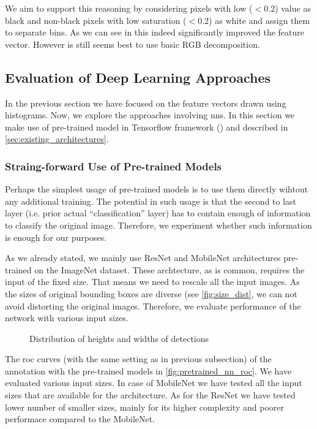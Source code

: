 We aim to support this reasoning by considering pixels with low ($< 0.2$)
value as black and non-black pixels with low saturation ($< 0.2$) as white and
assign them to separate bins. As we can see in  this indeed
significantly improved the feature vector. However is still seems best to
use basic RGB decomposition.

\subsection{Evaluation of Deep Learning Approaches}

In the previous section we have focused on the feature vectors drawn using
histograms. Now, we explore the approaches involving \glspl{nn}. In this
section we make use of pre-trained model in Tensorflow framework
(\cite{tensorflow}) and described in \autoref{sec:existing_architectures}.

\subsubsection{Straing-forward Use of Pre-trained Models}

Perhaps the simplest usage of pre-trained models is to use them directly
wihtout any additional training. The potential in such usage is that the
second to last layer (i.e. prior actual ``classification'' layer) has to
contain enough of information to classify the original image. Therefore,
we experiment whether such information is enough for our purposes.

As we already stated, we mainly use ResNet and MobileNet architectures
pre-trained on the ImageNet dataset. These archtecture, as is common,
requires the input of the fixed size. That means we need to rescale all the
input images. As the sizes of original bounding boxes are diverse (see
\autoref{fig:size_dist}, we can not avoid distorting the original images.
Therefore, we evaluate performance of the network with various input sizes.

\begin{figure}
    \centering
    \def\svgwidth{\columnwidth}
    
    \caption{Distribution of heights and widths of detections}
    \label{fig:size_dist}
\end{figure}

The \gls{roc} curves (with the same setting as in previous subsection) of the
annotation with the pre-trained models in \autoref{fig:pretrained_nn_roc}.
We have evaluated various input sizes. In case of MobileNet we have tested
all the input sizes that are available for the architecture. As for the 
ResNet we have tested lower number of smaller sizes, mainly for its higher
complexity and poorer performace compared to the MobileNet.


